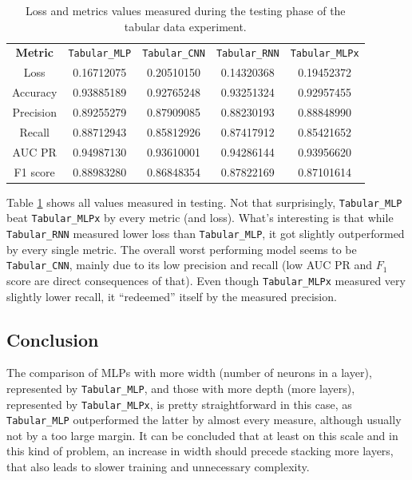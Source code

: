 \begin{table}[!h]
\centering
\begin{tabular}{|c|c|c|c|c|}
    \cline{1-5}
    \textbf{Metric} & \texttt{Tabular\_MLP} & \texttt{Tabular\_CNN} & \texttt{Tabular\_RNN} & \texttt{Tabular\_MLPx} \\
    \cline{1-5}
    Loss & 0.16712075 & 0.20510150 & 0.14320368 & 0.19452372 \\
    \cline{1-5}
    Accuracy & 0.93885189 & 0.92765248 & 0.93251324 & 0.92957455 \\
    \cline{1-5}
    Precision & 0.89255279 & 0.87909085 & 0.88230193 & 0.88848990 \\ 
    \cline{1-5}
    Recall & 0.88712943 & 0.85812926 & 0.87417912 & 0.85421652 \\
    \cline{1-5}
    AUC PR & 0.94987130 & 0.93610001 & 0.94286144 & 0.93956620 \\
    \cline{1-5}
    F1 score & 0.88983280 & 0.86848354 & 0.87822169 & 0.87101614 \\
    \cline{1-5}
\end{tabular}
\caption{Loss and metrics values measured during the testing phase of the tabular data experiment.}
\label{table:tabular-test}
\end{table}
Table \ref{table:tabular-test} shows all values measured in testing.
Not that surprisingly, \texttt{Tabular\_MLP} beat \texttt{Tabular\_MLPx} by every metric (and loss).
What's interesting is that while \texttt{Tabular\_RNN} measured lower loss than \texttt{Tabular\_MLP}, it got
slightly outperformed by every single metric.
The overall worst performing model seems to be \texttt{Tabular\_CNN}, mainly due to its low precision and recall
(low AUC PR and $F_1$
score are direct consequences of that). Even though \texttt{Tabular\_MLPx} measured very slightly lower recall, it ``redeemed''
itself by the measured precision.


\subsection{Conclusion}
The comparison of MLPs with more width (number of neurons in a layer), represented by \texttt{Tabular\_MLP},
and those with more depth (more layers), represented by \texttt{Tabular\_MLPx}, is pretty straightforward in this case,
as  \texttt{Tabular\_MLP} outperformed the latter by almost every measure, although usually not by a too large margin.
It can be concluded that at least on this scale and in this kind of problem, an increase in width should precede
stacking more layers, that also leads to slower training and unnecessary complexity.

